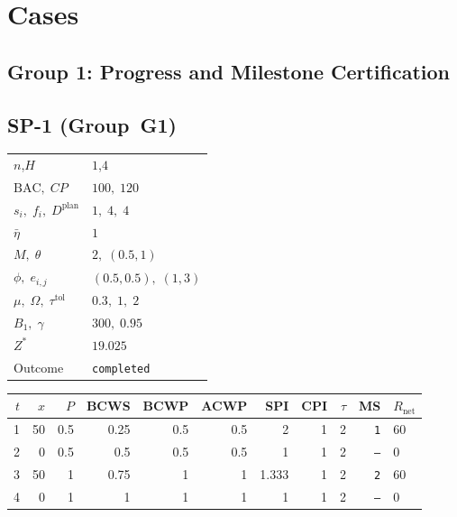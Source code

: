 \documentclass[12pt, a4paper]{article}
\newcommand{\BAC}{\mathrm{BAC}}
\begin{document}
\newpage

\section*{Cases}

\subsection*{Group 1: Progress and Milestone Certification}

\subsection*{SP-1  (Group~G1)}
\begin{center}
\begin{tabular}{ll}
\toprule
$n$,\;$H$ & $1$,\;$4$ \\
$\BAC,\;CP$ & $100,\;120$ \\
$s_i,\;f_i,\;D^{\mathrm{plan}}$ & $1,\;4,\;4$ \\
$\bar\eta$ & $1$ \\
$M,\;\theta$ & $2,\;(0.5,1)$ \\
$\phi,\;e_{i,j}$ & $(0.5,0.5),\;(1,3)$ \\
$\mu,\;\Omega,\;\tau^{\mathrm{tol}}$ & $0.3,\;1,\;2$ \\
$B_1,\;\gamma$ & $300,\;0.95$ \\
$Z^*$ & $19.025$ \\
Outcome & \texttt{completed} \\
\bottomrule
\end{tabular}
\end{center}

\begin{center}
\begin{tabular}{rrrrrrrrrrl}
\toprule
$t$ & $x$ & $P$ & BCWS & BCWP & ACWP & SPI & CPI & $\tau$ & MS & $R_{\mathrm{net}}$\\
\midrule
1 & 50 & 0.5 & 0.25 & 0.5 & 0.5 & 2 & 1 & 2 & \texttt{1} & 60 \\
2 & 0 & 0.5 & 0.5 & 0.5 & 0.5 & 1 & 1 & 2 & \texttt{---} & 0 \\
3 & 50 & 1 & 0.75 & 1 & 1 & 1.333 & 1 & 2 & \texttt{2} & 60 \\
4 & 0 & 1 & 1 & 1 & 1 & 1 & 1 & 2 & \texttt{---} & 0 \\
\bottomrule
\end{tabular}
\end{center}
\end{document}
